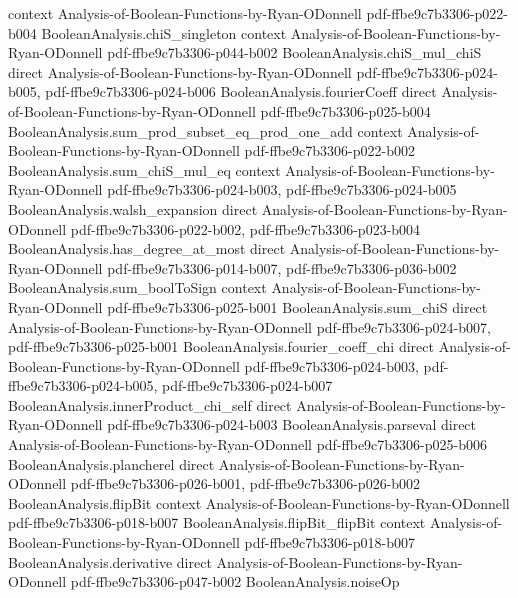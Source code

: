 \begin{theorem}
  {context}
  {Analysis-of-Boolean-Functions-by-Ryan-ODonnell}
  {pdf-ffbe9c7b3306-p022-b004}
\proofstep
  {BooleanAnalysis.chiS_singleton}
  {context}
  {Analysis-of-Boolean-Functions-by-Ryan-ODonnell}
  {pdf-ffbe9c7b3306-p044-b002}
\proofstep
  {BooleanAnalysis.chiS_mul_chiS}
  {direct}
  {Analysis-of-Boolean-Functions-by-Ryan-ODonnell}
  {pdf-ffbe9c7b3306-p024-b005,
    pdf-ffbe9c7b3306-p024-b006}
\proofstep
  {BooleanAnalysis.fourierCoeff}
  {direct}
  {Analysis-of-Boolean-Functions-by-Ryan-ODonnell}
  {pdf-ffbe9c7b3306-p025-b004}
\proofstep
  {BooleanAnalysis.sum_prod_subset_eq_prod_one_add}
  {context}
  {Analysis-of-Boolean-Functions-by-Ryan-ODonnell}
  {pdf-ffbe9c7b3306-p022-b002}
\proofstep
  {BooleanAnalysis.sum_chiS_mul_eq}
  {context}
  {Analysis-of-Boolean-Functions-by-Ryan-ODonnell}
  {pdf-ffbe9c7b3306-p024-b003,
    pdf-ffbe9c7b3306-p024-b005}
\proofstep
  {BooleanAnalysis.walsh_expansion}
  {direct}
  {Analysis-of-Boolean-Functions-by-Ryan-ODonnell}
  {pdf-ffbe9c7b3306-p022-b002,
    pdf-ffbe9c7b3306-p023-b004}
\proofstep
  {BooleanAnalysis.has_degree_at_most}
  {direct}
  {Analysis-of-Boolean-Functions-by-Ryan-ODonnell}
  {pdf-ffbe9c7b3306-p014-b007,
    pdf-ffbe9c7b3306-p036-b002}
\proofstep
  {BooleanAnalysis.sum_boolToSign}
  {context}
  {Analysis-of-Boolean-Functions-by-Ryan-ODonnell}
  {pdf-ffbe9c7b3306-p025-b001}
\proofstep
  {BooleanAnalysis.sum_chiS}
  {direct}
  {Analysis-of-Boolean-Functions-by-Ryan-ODonnell}
  {pdf-ffbe9c7b3306-p024-b007,
    pdf-ffbe9c7b3306-p025-b001}
\proofstep
  {BooleanAnalysis.fourier_coeff_chi}
  {direct}
  {Analysis-of-Boolean-Functions-by-Ryan-ODonnell}
  {pdf-ffbe9c7b3306-p024-b003,
    pdf-ffbe9c7b3306-p024-b005,
    pdf-ffbe9c7b3306-p024-b007}
\proofstep
  {BooleanAnalysis.innerProduct_chi_self}
  {direct}
  {Analysis-of-Boolean-Functions-by-Ryan-ODonnell}
  {pdf-ffbe9c7b3306-p024-b003}
\proofstep
  {BooleanAnalysis.parseval}
  {direct}
  {Analysis-of-Boolean-Functions-by-Ryan-ODonnell}
  {pdf-ffbe9c7b3306-p025-b006}
\proofstep
  {BooleanAnalysis.plancherel}
  {direct}
  {Analysis-of-Boolean-Functions-by-Ryan-ODonnell}
  {pdf-ffbe9c7b3306-p026-b001,
    pdf-ffbe9c7b3306-p026-b002}
\proofstep
  {BooleanAnalysis.flipBit}
  {context}
  {Analysis-of-Boolean-Functions-by-Ryan-ODonnell}
  {pdf-ffbe9c7b3306-p018-b007}
\proofstep
  {BooleanAnalysis.flipBit_flipBit}
  {context}
  {Analysis-of-Boolean-Functions-by-Ryan-ODonnell}
  {pdf-ffbe9c7b3306-p018-b007}
\proofstep
  {BooleanAnalysis.derivative}
  {direct}
  {Analysis-of-Boolean-Functions-by-Ryan-ODonnell}
  {pdf-ffbe9c7b3306-p047-b002}
\proofstep
  {BooleanAnalysis.noiseOp}

\end{theorem}
